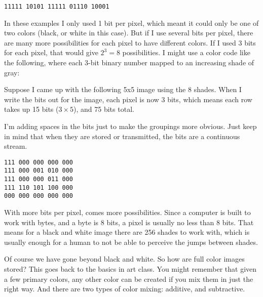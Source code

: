 \begin{verbatim}
11111 10101 11111 01110 10001
\end{verbatim}

In these examples I only used 1 bit per pixel, which meant it could only be one of two colors (black, or white in this case). But if I use several bits per pixel, there are many more possibilities for each pixel to have different colors. If I used 3 bits for each pixel, that would give \(2^3 = 8\) possibilities. I might use a color code like the following, where each 3-bit binary number mapped to an increasing shade of gray:

\begin{center}\end{center}

Suppose I came up with the following 5x5 image using the 8 shades. When I write the bits out for the image, each pixel is now 3 bits, which means each row takes up 15 bits (\(3\times5\)), and 75 bits total.

\begin{center}\end{center}

I'm adding spaces in the bits just to make the groupings more obvious. Just keep in mind that when they are stored or transmitted, the bits are a continuous stream.

\begin{verbatim}
111 000 000 000 000
111 000 001 010 000   
111 000 000 011 000   
111 110 101 100 000   
000 000 000 000 000
\end{verbatim}

With more bits per pixel, comes more possibilities. Since a computer is built to work with bytes, and a byte is 8 bits, a pixel is usually no less than 8 bits. That means for a black and white image there are 256 shades to work with, which is usually enough for a human to not be able to perceive the jumps between shades.\\

\begin{center}\end{center}

Of course we have gone beyond black and white. So how are full color images stored? This goes back to the basics in art class. You might remember that given a few primary colors, any other color can be created if you mix them in just the right way. And there are two types of color mixing: additive, and subtractive.\\

